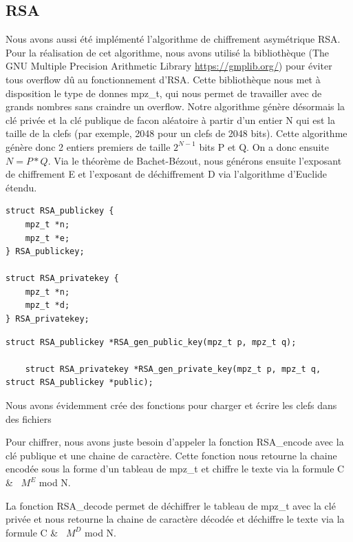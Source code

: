         \subsection{RSA}
        Nous avons aussi été implémenté l’algorithme de chiffrement asymétrique RSA. Pour la réalisation de cet algorithme, nous avons utilisé la bibliothèque (The GNU Multiple Precision Arithmetic Library \url{https://gmplib.org/}) pour éviter tous overflow dû au fonctionnement d’RSA. Cette bibliothèque nous met à disposition le type de donnes mpz\_t, qui nous permet de travailler avec de grands nombres sans craindre un overflow.
        Notre algorithme génère désormais la clé privée et la clé publique de facon aléatoire à partir d'un entier N qui est la taille de la clefs (par exemple, 2048 pour un clefs de 2048 bits). Cette algorithme génère donc 2 entiers premiers de taille $2^{N-1}$ bits P et Q. On a donc ensuite $N = P * Q$.
        Via le théorème de Bachet-Bézout, nous générons ensuite l'exposant de chiffrement E et l'exposant de déchiffrement D via l'algorithme d'Euclide étendu.

        \begin{lstlisting}[style=CStyle]
struct RSA_publickey {
    mpz_t *n;
    mpz_t *e;
} RSA_publickey;
    
struct RSA_privatekey {
    mpz_t *n;
    mpz_t *d;
} RSA_privatekey;
		\end{lstlisting}	
		
       \begin{lstlisting}[style=CStyle]
    struct RSA_publickey *RSA_gen_public_key(mpz_t p, mpz_t q);
    
    struct RSA_privatekey *RSA_gen_private_key(mpz_t p, mpz_t q, struct RSA_publickey *public);
		\end{lstlisting}
		Nous avons évidemment crée des fonctions pour charger et écrire les clefs dans des fichiers 
		
        Pour chiffrer, nous avons juste besoin d’appeler la fonction RSA\_encode avec la clé publique et une chaine de caractère. Cette fonction nous retourne la chaine encodée sous la forme d’un tableau de mpz\_t et chiffre le texte via la formule C &\equiv ~ $M^{E}$ mod N.

        La fonction RSA\_decode permet de déchiffrer le tableau de mpz\_t avec la clé privée et nous retourne la chaine de caractère décodée et déchiffre le texte via la formule C &\equiv ~ $M^{D}$ mod N. \\

    \newpage

